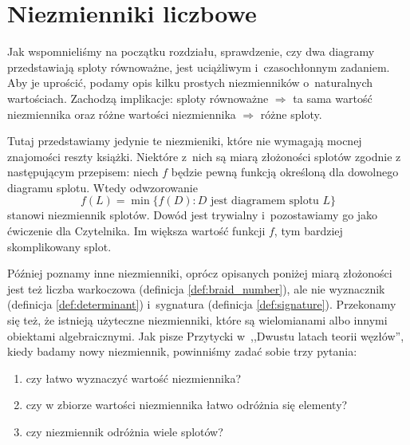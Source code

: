 
\section{Niezmienniki liczbowe}
Jak wspomnieliśmy na początku rozdziału, sprawdzenie, czy dwa diagramy przedstawiają sploty równoważne, jest uciążliwym i~czasochłonnym zadaniem.
Aby je uprościć, podamy opis kilku prostych niezmienników o~naturalnych wartościach.
Zachodzą implikacje:
sploty równoważne $\Rightarrow$ ta sama wartość niezmiennika
oraz różne wartości niezmiennika $\Rightarrow$ różne sploty.

Tutaj przedstawiamy jedynie te niezmieniki, które nie wymagają mocnej znajomości reszty książki.
Niektóre z~nich są miarą złożoności splotów zgodnie z następującym przepisem: niech $f$ będzie pewną funkcją określoną dla dowolnego diagramu splotu.
Wtedy odwzorowanie
\begin{equation}
    f(L) = \min \{f(D) : D \text{ jest diagramem splotu } L\}
\end{equation}
stanowi niezmiennik splotów.
Dowód jest trywialny i~pozostawiamy go jako ćwiczenie dla Czytelnika.
Im większa wartość funkcji $f$, tym bardziej skomplikowany splot.

Później poznamy inne niezmienniki, oprócz opisanych poniżej miarą złożoności jest też liczba warkoczowa (definicja \ref{def:braid_number}), ale nie wyznacznik (definicja \ref{def:determinant}) i~sygnatura (definicja \ref{def:signature}).
Przekonamy się też, że istnieją użyteczne niezmienniki, które są wielomianami albo innymi obiektami algebraicznymi.
Jak pisze Przytycki w~,,Dwustu latach teorii węzłów'', kiedy badamy nowy niezmiennik, powinniśmy zadać sobie trzy pytania:
\begin{enumerate}
    \item czy łatwo wyznaczyć wartość niezmiennika?
    \item czy w zbiorze wartości niezmiennika łatwo odróżnia się elementy?
    \item czy niezmiennik odróżnia wiele splotów?
\end{enumerate}













